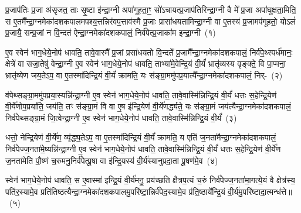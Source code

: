 {\anuvakamend[{नामा॒ग्निः सꣳ शव॑सो॒ रक्ष॑माणा धी॒र्या॑चि॒देका॒न्नप॑ञ्चा॒शच्च॑}]}%

{}


\setcounter{anuvakam}{0}
प्र॒जा\-प॑तिः प्र॒जा अ॑सृजत॒ ताः सृ॒ष्टा इ॑न्द्रा॒ग्नी अपा॑गूहता॒ꣳ॒ सो॑\-ऽचायत्प्र॒जा\-प॑तिरिन्द्रा॒ग्नी वै मे᳚ प्र॒जा अपा॑घुक्षता॒मिति॒ स ए॒तमै᳚न्द्रा॒ग्नमेका॑\-दश\-कपालमपश्य॒त्तन्निर॑वप॒त्ताव॑स्मै प्र॒जाः प्रासा॑धयतामिन्द्रा॒ग्नी वा ए॒तस्य॑ प्र॒जामप॑गूहतो॒ यो\-ऽलं॑ प्र॒जायै॒ सन्प्र॒जां न वि॒न्दत॑ ऐन्द्रा॒ग्नमेका॑\-दश\-कपालं॒ निर्व॑पेत्प्र॒जाका॑म इन्द्रा॒ग्नी~(१)

ए॒व स्वेन॑ भाग॒धेये॒नोप॑ धावति॒ तावे॒वास्मै᳚ प्र॒जां प्रसा॑धयतो वि॒न्दते᳚ प्र॒जामै᳚न्द्रा॒ग्नमेका॑\-दश\-कपालं॒ निर्व॑पे॒थ्स्पर्ध॑मानः॒ क्षेत्रे॑ वा सजा॒तेषु॑ वेन्द्रा॒ग्नी ए॒व स्वेन॑ भाग॒धेये॒नोप॑ धावति॒ ताभ्या॑मे॒वेन्द्रि॒यं वी॒र्यं॑ भ्रातृ॑व्यस्य वृङ्क्ते॒ वि पा॒प्मना॒ भ्रातृ॑व्येण जय॒ते\-ऽप॒ वा ए॒तस्मा॑दिन्द्रि॒यं वी॒र्यं॑ क्रामति॒ यः स॑ङ्ग्रा॒ममु॑पप्र॒यात्यै᳚न्द्रा॒ग्नमेका॑\-दश\-कपालं॒ निर्-~(२)

व॑पेथ्सङ्ग्रा॒ममु॑पप्रया॒स्यन्नि॑न्द्रा॒ग्नी ए॒व स्वेन॑ भाग॒धेये॒नोप॑ धावति॒ तावे॒वास्मि॑न्निन्द्रि॒यं वी॒र्यं॑ धत्तः स॒हेन्द्रि॒येण॑ वी॒र्ये॑णोप॒प्रया॑ति॒ जय॑ति॒ तꣳ स॑ङ्ग्रा॒मं वि वा ए॒ष इ॑न्द्रि॒येण॑ वी॒र्ये॑णर्द्ध्यते॒ यः स॑ङ्ग्रा॒मं जय॑त्यैन्द्रा॒ग्नमेका॑\-दश\-कपालं॒ निर्व॑पेथ्सङ्ग्रा॒मं जि॒त्वेन्द्रा॒ग्नी ए॒व स्वेन॑ भाग॒धेये॒नोप॑ धावति॒ तावे॒वास्मि॑न्निन्द्रि॒यं वी॒र्यं॑~(३)

धत्तो॒ नेन्द्रि॒येण॑ वी॒र्ये॑ण॒ व्यृ॑द्ध्य॒ते\-ऽप॒ वा ए॒तस्मा॑दिन्द्रि॒यं वी॒र्यं॑ क्रामति॒ य एति॑ ज॒नता॑मैन्द्रा॒ग्नमेका॑\-दश\-कपालं॒ निर्व॑पेज्ज॒नता॑\-मे॒ष्यन्नि॑न्द्रा॒ग्नी ए॒व स्वेन॑ भाग॒धेये॒नोप॑ धावति॒ तावे॒वास्मि॑न्निन्द्रि॒यं वी॒र्यं॑ धत्तः स॒हेन्द्रि॒येण॑ वी॒र्ये॑ण ज॒नता॑मेति पौ॒ष्णं च॒रुमनु॒निर्व॑पेत्पू॒षा वा इ॑न्द्रि॒यस्य॑ वी॒र्य॑स्यानुप्रदा॒ता पू॒षण॑मे॒व~(४)

स्वेन॑ भाग॒धेये॒नोप॑ धावति॒ स ए॒वास्मा॑ इन्द्रि॒यं वी॒र्य॑मनु॒ प्रय॑च्छति क्षैत्रप॒त्यं च॒रुं निर्व॑पेज्ज॒नता॑मा॒गत्ये॒यं वै क्षेत्र॑स्य॒ पति॑र॒स्यामे॒व प्रति॑तिष्ठत्यैन्द्रा॒ग्नमेका॑\-दश\-कपालमु॒परि॑ष्टा॒\-न्निर्व॑पेद॒स्यामे॒व प्र॑ति॒ष्ठाये᳚न्द्रि॒यं वी॒र्य॑मु॒परि॑ष्टादा॒त्मन्ध॑त्ते॥~(५)

